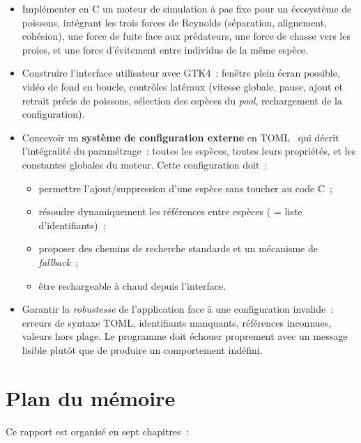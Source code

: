 \begin{itemize}[leftmargin=*]
  \item Implémenter en C un moteur de simulation à pas fixe pour un
    écosystème de poissons, intégrant les trois forces de Reynolds
    (séparation, alignement, cohésion), une force de fuite face aux
    prédateurs, une force de chasse vers les proies, et une force
    d'évitement entre individus de la même espèce.

  \item Construire l'interface utilisateur avec GTK4~: fenêtre
    plein écran possible, vidéo de fond en boucle, contrôles latéraux
    (vitesse globale, pause, ajout et retrait précis de poissons,
    sélection des espèces du \emph{pool}, rechargement de la
    configuration).

  \item Concevoir un \textbf{système de configuration externe} en
    TOML~\cite{tomlspec} qui décrit l'intégralité du paramétrage~:
    toutes les espèces, toutes leurs propriétés, et les constantes
    globales du moteur. Cette configuration doit~:
    \begin{itemize}
      \item permettre l'ajout/suppression d'une espèce sans toucher
        au code C~;
      \item résoudre dynamiquement les références entre espèces
        ( = liste d'identifiants)~;
      \item proposer des chemins de recherche standards et un
        mécanisme de \emph{fallback}~;
      \item être rechargeable à chaud depuis l'interface.
    \end{itemize}

  \item Garantir la \emph{robustesse} de l'application face à une
    configuration invalide~: erreurs de syntaxe TOML, identifiants
    manquants, références  inconnues, valeurs hors plage.
    Le programme doit échouer proprement avec un message lisible
    plutôt que de produire un comportement indéfini.
\end{itemize}

\section{Plan du mémoire}

Ce rapport est organisé en sept chapitres~:

